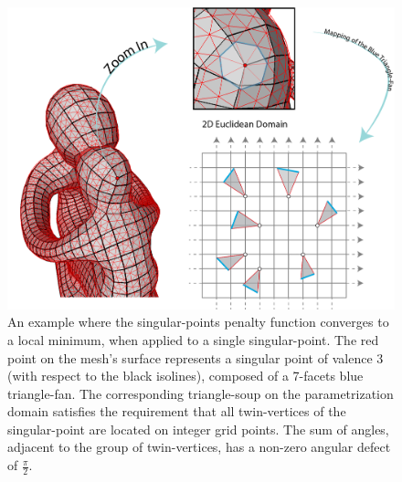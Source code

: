 \begin{figure}[ht]
\centering
\includegraphics[width=12cm]{figures/singular_points/singular_points_penalty_function_minimum.png}
\caption[Singular-Points Penalty Function Global Minimum Example]{An example where the singular-points penalty function converges to a local minimum, when applied to a single singular-point. The red point on the mesh's surface represents a singular point of valence 3 (with respect to the black isolines), composed of a 7-facets blue triangle-fan. The corresponding triangle-soup on the parametrization domain satisfies the requirement that all twin-vertices of the singular-point are located on integer grid points. The sum of angles, adjacent to the group of twin-vertices, has a non-zero angular defect of $\frac{\pi}{2}$.}
\label{fig:singular_points_penalty_minimum}
\end{figure}
